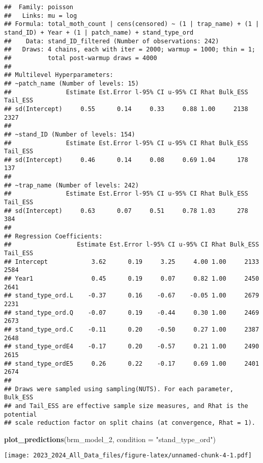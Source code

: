 \documentclass[
]{article}
\newenvironment{Shaded}{\begin{snugshade}}{\end{snugshade}}
\newcommand{\AttributeTok}[1]{\textcolor[rgb]{0.13,0.29,0.53}{#1}}
\newcommand{\FunctionTok}[1]{\textcolor[rgb]{0.13,0.29,0.53}{\textbf{#1}}}
\newcommand{\NormalTok}[1]{#1}
\newcommand{\StringTok}[1]{\textcolor[rgb]{0.31,0.60,0.02}{#1}}
\begin{document}
\begin{verbatim}
##  Family: poisson 
##   Links: mu = log 
## Formula: total_moth_count | cens(censored) ~ (1 | trap_name) + (1 | stand_ID) + Year + (1 | patch_name) + stand_type_ord 
##    Data: stand_ID_filtered (Number of observations: 242) 
##   Draws: 4 chains, each with iter = 2000; warmup = 1000; thin = 1;
##          total post-warmup draws = 4000
## 
## Multilevel Hyperparameters:
## ~patch_name (Number of levels: 15) 
##               Estimate Est.Error l-95% CI u-95% CI Rhat Bulk_ESS Tail_ESS
## sd(Intercept)     0.55      0.14     0.33     0.88 1.00     2138     2327
## 
## ~stand_ID (Number of levels: 154) 
##               Estimate Est.Error l-95% CI u-95% CI Rhat Bulk_ESS Tail_ESS
## sd(Intercept)     0.46      0.14     0.08     0.69 1.04      178      137
## 
## ~trap_name (Number of levels: 242) 
##               Estimate Est.Error l-95% CI u-95% CI Rhat Bulk_ESS Tail_ESS
## sd(Intercept)     0.63      0.07     0.51     0.78 1.03      278      384
## 
## Regression Coefficients:
##                  Estimate Est.Error l-95% CI u-95% CI Rhat Bulk_ESS Tail_ESS
## Intercept            3.62      0.19     3.25     4.00 1.00     2133     2584
## Year1                0.45      0.19     0.07     0.82 1.00     2450     2641
## stand_type_ord.L    -0.37      0.16    -0.67    -0.05 1.00     2679     2231
## stand_type_ord.Q    -0.07      0.19    -0.44     0.30 1.00     2469     2673
## stand_type_ord.C    -0.11      0.20    -0.50     0.27 1.00     2387     2648
## stand_type_ordE4    -0.17      0.20    -0.57     0.21 1.00     2490     2615
## stand_type_ordE5     0.26      0.22    -0.17     0.69 1.00     2401     2674
## 
## Draws were sampled using sampling(NUTS). For each parameter, Bulk_ESS
## and Tail_ESS are effective sample size measures, and Rhat is the potential
## scale reduction factor on split chains (at convergence, Rhat = 1).
\end{verbatim}

\begin{Shaded}
\begin{Highlighting}[]
\FunctionTok{plot\_predictions}\NormalTok{(brm\_model\_2, }\AttributeTok{condition =} \StringTok{"stand\_type\_ord"}\NormalTok{)}
\end{Highlighting}
\end{Shaded}

\texttt{[image: 2023\_2024\_All\_Data\_files/figure-latex/unnamed-chunk-4-1.pdf]}
\end{document}

